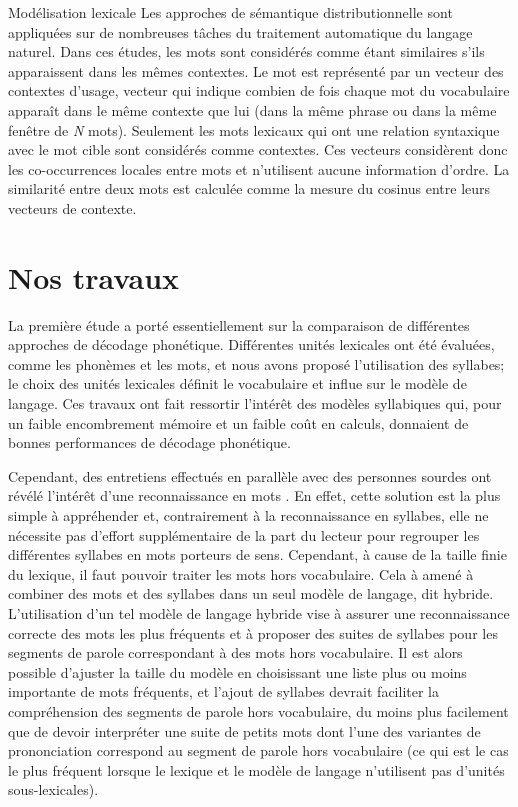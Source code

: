 \documentclass{style/these}
\let\oldcite=\cite
\renewcommand{\cite}[1]{{\fontfamily{qcs}\selectfont{\color{darkerblue}[\oldcite{#1}]}}}
\begin{document}
\begin{part}{Modélisation lexicale}
Les approches de sémantique distributionnelle \cite{Turney:2010, Mikolov:2013} sont appliquées sur de nombreuses tâches du traitement automatique du langage naturel. 
Dans ces études, les mots sont considérés comme étant similaires s'ils apparaissent dans les mêmes contextes. 
Le mot est représenté par un vecteur des contextes d'usage, vecteur qui indique combien de fois chaque mot du vocabulaire apparaît dans le même contexte que lui (dans la même phrase ou dans la même fenêtre de \textit{N} mots). 
Seulement les mots lexicaux qui ont une relation syntaxique avec le mot cible sont considérés comme contextes. 
Ces vecteurs considèrent donc les co-occurrences locales entre mots et n'utilisent aucune information d'ordre. 
La similarité entre deux mots est calculée comme la mesure du cosinus entre leurs vecteurs de contexte. 

\section{Nos travaux}
\renewcommand{\rightmark}{Nos travaux}

La première étude a porté essentiellement sur la comparaison de différentes approches de décodage phonétique. 
Différentes unités lexicales ont été évaluées, comme les phonèmes et les mots, et nous avons proposé l'utilisation des syllabes; le choix des unités lexicales définit le vocabulaire et influe sur le modèle de langage. 
Ces travaux ont fait ressortir l'intérêt des modèles syllabiques qui, pour un faible encombrement mémoire et un faible coût en calculs,
donnaient de bonnes performances de décodage phonétique. 

Cependant, des entretiens effectués en parallèle avec des personnes sourdes ont révélé l'intérêt d'une reconnaissance en mots \cite{Piquard:2015}. 
En effet, cette solution est la plus simple à appréhender et, contrairement à la reconnaissance en syllabes, elle ne nécessite pas d'effort supplémentaire de la part du lecteur pour regrouper les différentes syllabes en mots porteurs de sens. 
Cependant, à cause de la taille finie du lexique, il faut pouvoir traiter les mots hors vocabulaire.
Cela à amené à combiner des mots et des syllabes dans un seul modèle de langage, dit hybride. 
L'utilisation d'un tel modèle de langage hybride vise à assurer une reconnaissance correcte des mots les plus fréquents et à proposer des suites de syllabes pour les segments de parole correspondant à des mots hors vocabulaire. 
Il est alors possible d'ajuster la taille du modèle en choisissant une liste plus ou moins importante de mots fréquents, et l'ajout de syllabes devrait faciliter la compréhension des segments de parole hors vocabulaire, du moins plus facilement que de devoir interpréter une suite de petits mots dont l'une des variantes de prononciation correspond au segment de parole hors vocabulaire (ce qui est le cas le plus fréquent lorsque le lexique et le modèle de langage n'utilisent pas d'unités sous-lexicales).


\end{part}
\end{document}
